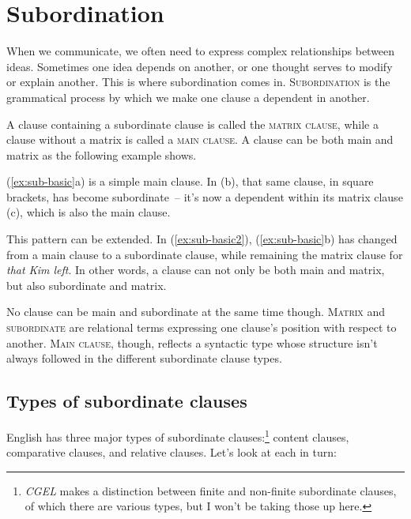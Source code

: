 \section{Subordination}\label{sec:subordination}

When we communicate, we often need to express complex relationships between ideas. Sometimes one idea depends on another, or one thought serves to modify or explain another. This is where subordination comes in. \textsc{Subordination} is the grammatical process by which we make one clause a dependent in another.

A clause containing a subordinate clause is called the \textsc{matrix clause}, while a clause without a matrix is called a \textsc{main clause.} A clause can be both main and matrix as the following example shows.

\ea \label{ex:sub-basic}
    \z
\z

(\ref{ex:sub-basic}a) is a simple main clause. In (b), that same clause, in square brackets, has become subordinate~-- it's now a dependent within its matrix clause (c), which is also the main clause.

This pattern can be extended. In (\ref{ex:sub-basic2}), (\ref{ex:sub-basic}b) has changed from a main clause to a subordinate clause, while remaining the matrix clause for \textit{that Kim left}. In other words, a clause can not only be both main and matrix, but also subordinate and matrix.

\label{ex:sub-basic2}
\z

No clause can be main and subordinate at the same time though. \textsc{Matrix} and \textsc{subordinate} are relational terms expressing one clause's position with respect to another. \textsc{Main clause}, though, reflects a syntactic type whose structure isn't always followed in the different subordinate clause types.

\subsection{Types of subordinate clauses}

English has three major types of subordinate clauses:\footnote{\textit{CGEL} makes a distinction between finite and non-finite subordinate clauses, of which there are various types, but I won't be taking those up here.} content clauses, comparative clauses, and relative clauses. Let's look at each in turn:

